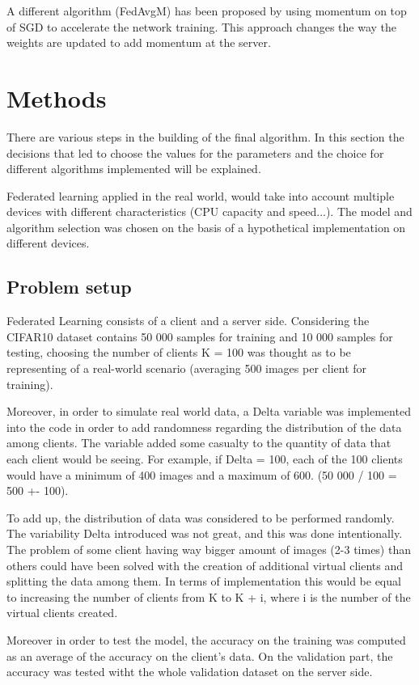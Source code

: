 \documentclass[twocolumn]{article}
\begin{document}
A different algorithm (FedAvgM) has been proposed by \cite{DBLP:journals/corr/abs-1909-06335} using momentum on top of SGD to accelerate the network training. This approach changes the way the weights are updated to add momentum at the server.

\section{Methods} %
There are various steps in the building of the final algorithm. In this section the decisions that led to choose the values for the parameters and the choice for different algorithms implemented will be explained. 

Federated learning applied in the real world, would take into account multiple devices with different characteristics (CPU capacity and speed...). The model and algorithm selection was chosen on the basis of a hypothetical implementation on different devices.  

\subsection{Problem setup}
Federated Learning consists of a client and a server side. Considering the CIFAR10 dataset contains 50 000 samples for training and 10 000 samples for testing, choosing the number of clients K = 100 was thought as to be representing of a real-world scenario (averaging 500 images per client for training). 

Moreover, in order to simulate real world data, a Delta variable was implemented into the code in order to add randomness regarding the distribution of the data among clients. The variable added some casualty to the quantity of data that each client would be seeing. For example, if Delta = 100, each of the 100 clients would have a minimum of 400 images and a maximum of 600. (50 000 / 100 = 500 +- 100).


To add up, the distribution of data was considered to be performed randomly. The variability Delta introduced was not great, and this was done intentionally. The problem of some client having way bigger amount of images (2-3 times) than others could have been solved with the creation of additional virtual clients and splitting the data among them. In terms of implementation this would be equal to increasing the number of clients from K to K + i, where i is the number of the virtual clients created. 

Moreover in order to test the model, the accuracy on the training was computed as an average of the accuracy on the client's data. On the validation part, the accuracy was tested witht the whole validation dataset on the server side.
\end{document}
